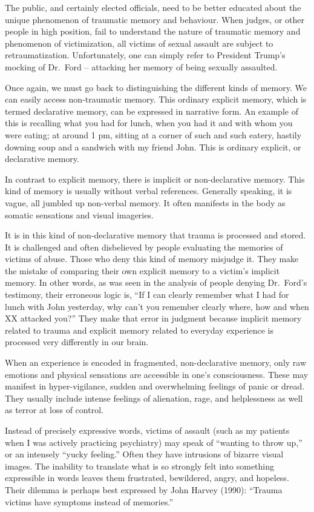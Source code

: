 \documentclass[]{book}
\begin{document}
The public, and certainly elected officials, need to be better educated about the unique phenomenon of traumatic memory and behaviour. When judges, or other people in high position, fail to understand the nature of traumatic memory and phenomenon of victimization, all victims of sexual assault are subject to retraumatization. Unfortunately, one can simply refer to President Trump's mocking of Dr.~Ford -- attacking her memory of being sexually assaulted.

Once again, we must go back to distinguishing the different kinds of memory. We can easily access non-traumatic memory. This ordinary explicit memory, which is termed declarative memory, can be expressed in narrative form. An example of this is recalling what you had for lunch, when you had it and with whom you were eating; at around 1 pm, sitting at a corner of such and such eatery, hastily downing soup and a sandwich with my friend John. This is ordinary explicit, or declarative memory.

In contrast to explicit memory, there is implicit or non-declarative memory. This kind of memory is usually without verbal references. Generally speaking, it is vague, all jumbled up non-verbal memory. It often manifests in the body as somatic sensations and visual imageries.

It is in this kind of non-declarative memory that trauma is processed and stored. It is challenged and often disbelieved by people evaluating the memories of victims of abuse. Those who deny this kind of memory misjudge it. They make the mistake of comparing their own explicit memory to a victim's implicit memory. In other words, as was seen in the analysis of people denying Dr.~Ford's testimony, their erroneous logic is, ``If I can clearly remember what I had for lunch with John yesterday, why can't you remember clearly where, how and when XX attacked you?'' They make that error in judgment because implicit memory related to trauma and explicit memory related to everyday experience is processed very differently in our brain.

When an experience is encoded in fragmented, non-declarative memory, only raw emotions and physical sensations are accessible in one's consciousness. These may manifest in hyper-vigilance, sudden and overwhelming feelings of panic or dread. They usually include intense feelings of alienation, rage, and helplessness as well as terror at loss of control.

Instead of precisely expressive words, victims of assault (such as my patients when I was actively practicing psychiatry) may speak of ``wanting to throw up,'' or an intensely ``yucky feeling.'' Often they have intrusions of bizarre visual images. The inability to translate what is so strongly felt into something expressible in words leaves them frustrated, bewildered, angry, and hopeless. Their dilemma is perhaps best expressed by John Harvey (1990): ``Trauma victims have symptoms instead of memories.''
\end{document}
